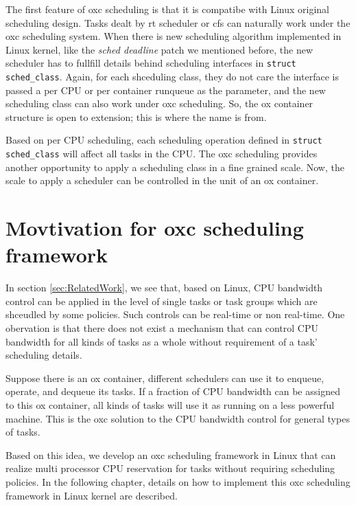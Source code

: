 The first feature of oxc scheduling is that it is compatibe with Linux original
scheduling design. Tasks dealt by rt scheduler or cfs can naturally work under the
oxc scheduling system. When there is new scheduling algorithm implemented in
Linux kernel, like the \emph{sched deadline} patch we mentioned before, the
new scheduler has to fullfill details behind scheduling interfaces in 
\texttt{struct sched\_class}. Again, for each shceduling class, they do not
care the interface is passed a per CPU or per container runqueue as the
parameter, and the new scheduling class can also work under oxc scheduling.
So, the ox container structure is open to extension; this is where the name
is from.

Based on per CPU scheduling, each scheduling operation defined in 
\texttt{struct sched\_class} will affect all tasks in the CPU. The
oxc scheduling provides another opportunity to apply a scheduling class in a 
fine grained scale. Now, the scale to apply a scheduler can be controlled 
in the unit of an ox container. 

\section{Movtivation for oxc scheduling framework}
In section \ref{sec:RelatedWork}, we see that, based on Linux, CPU bandwidth 
control can be applied in the level of single tasks or task groups which 
are shceudled by some policies. Such controls can be real-time or non real-time.
One obervation is that there does not exist a mechanism that can
control CPU bandwidth for all kinds of tasks as a whole without requirement of
a task' scheduling details. 

Suppose there is an ox container, different schedulers can use it to enqueue,
operate, and dequeue its tasks. If a fraction of CPU bandwidth can be assigned
to this ox container, all kinds of tasks will use it as running on a less powerful
machine. This is the oxc solution to the CPU bandwidth control for
general types of tasks.

Based on this idea, we develop an oxc scheduling framework in Linux that can 
realize multi processor CPU reservation for tasks without requiring scheduling
policies. 
In the following chapter, details on how to implement 
this oxc scheduling framework in Linux kernel are described.
